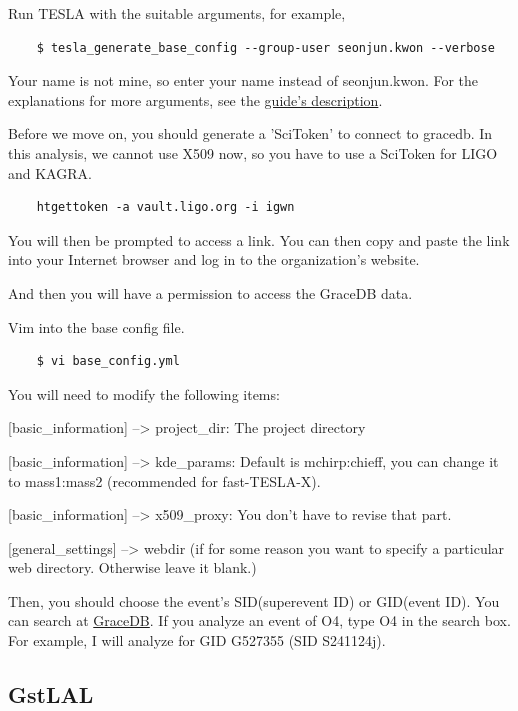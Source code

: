 Run TESLA with the suitable arguments, for example,

\begin{verbatim}
    $ tesla_generate_base_config --group-user seonjun.kwon --verbose
\end{verbatim}

Your name is not mine, so enter your name instead of seonjun.kwon. For the explanations for more arguments, see the \href{https://git.ligo.org/alvin.li/tesla/-/tree/o4a_version_1.0#setting-up-a-tesla-analysis}{guide's description}.

Before we move on, you should generate a 'SciToken' to connect to gracedb. In this analysis, we cannot use X509 now, so you have to use a SciToken for LIGO and KAGRA.

\begin{verbatim}
    htgettoken -a vault.ligo.org -i igwn
\end{verbatim}

You will then be prompted to access a link. You can then copy and paste the link into your Internet browser and log in to the organization's website.

And then you will have a permission to access the GraceDB data.

Vim into the base config file.

\begin{verbatim}
    $ vi base_config.yml
\end{verbatim}

You will need to modify the following items:

[basic\_information] --> project\_dir: The project directory

[basic\_information] --> kde\_params: Default is mchirp:chieff, you can change it to mass1:mass2 (recommended for fast-TESLA-X).

[basic\_information] --> x509\_proxy: You don't have to revise that part.

[general\_settings] --> webdir (if for some reason you want to specify a particular web directory. Otherwise leave it blank.)

Then, you should choose the event's SID(superevent ID) or GID(event ID). You can search at \href{https://gracedb.ligo.org/search/}{GraceDB}. If you analyze an event of O4, type O4 in the search box. For example, I will analyze for GID G527355 (SID S241124j).

\subsection{GstLAL}

